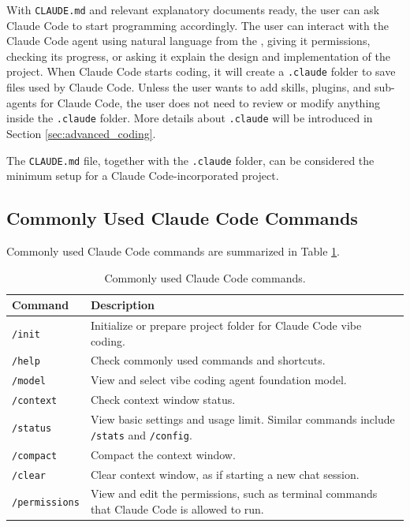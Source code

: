 With \verb|CLAUDE.md| and relevant explanatory documents ready, the user can ask Claude Code to start programming accordingly. The user can interact with the Claude Code agent using natural language from the , giving it permissions, checking its progress, or asking it explain the design and implementation of the project. When Claude Code starts coding, it will create a \verb|.claude| folder to save files used by Claude Code. Unless the user wants to add skills, plugins, and sub-agents for Claude Code, the user does not need to review or modify anything inside the \verb|.claude| folder. More details about \verb|.claude| will be introduced in Section \ref{sec:advanced_coding}.

The \verb|CLAUDE.md| file, together with the \verb|.claude| folder, can be considered the minimum setup for a Claude Code-incorporated project.

\subsection{Commonly Used Claude Code Commands}

Commonly used Claude Code commands are summarized in Table \ref{tab:claude_code_command}.

\begin{table}[!htb]
	\centering \caption{Commonly used Claude Code commands.}\label{tab:claude_code_command}
	\begin{tabularx}{\textwidth}{lX}
		\hline
		Command & Description \\ \hline
		\verb|/init| & Initialize or prepare project folder for Claude Code vibe coding. \\ 
        \verb|/help| & Check commonly used commands and shortcuts. \\
        \verb|/model| & View and select vibe coding agent foundation model. \\
        \verb|/context| & Check context window status. \\
        \verb|/status| & View basic settings and usage limit. Similar commands include \verb|/stats| and \verb|/config|. \\
        \verb|/compact| & Compact the context window. \\
        \verb|/clear| & Clear context window, as if starting a new chat session. \\
        \verb|/permissions| & View and edit the permissions, such as terminal commands that Claude Code is allowed to run. \\
		\hline
	\end{tabularx}
\end{table}

